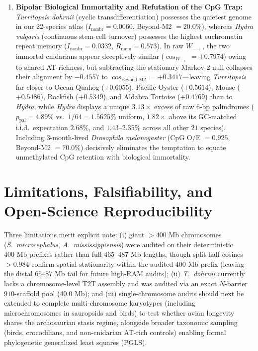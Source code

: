 \documentclass[11pt,a4paper]{article}
\renewcommand{\_}{\origunderscore\penalty200\relax}
\theoremstyle{remark}
\begin{document}
\begin{enumerate}
  \item \textbf{Bipolar Biological Immortality and Refutation of the CpG Trap:} \textit{Turritopsis dohrnii} (cyclic transdifferentiation) possesses the quietest genome in our 22-species atlas ($I_{\mathrm{nonbr}}=0.0060$, Beyond-M2 $=20.0\%$), whereas \textit{Hydra vulgaris} (continuous stem-cell turnover) possesses the highest euchromatin repeat memory ($I_{\mathrm{nonbr}}=0.0332$, $R_{\mathrm{mem}}=0.573$). In raw $W_{-+}$, the two immortal cnidarians appear deceptively similar ($\cos_{W_{-+}} = +0.7974$) owing to shared AT-richness, but subtracting the stationary Markov-2 null collapses their alignment by $-0.4557$ to $\cos_{\mathrm{Beyond\text{-}M2}} = +0.3417$---leaving \textit{Turritopsis} far closer to Ocean Quahog ($+0.6055$), Pacific Oyster ($+0.5614$), Mouse ($+0.5486$), Rockfish ($+0.5349$), and Aldabra Tortoise ($+0.4769$) than to \textit{Hydra}, while \textit{Hydra} displays a unique $3.13\times$ excess of raw 6-bp palindromes ($p_{\mathrm{pal}} = 4.89\%$ vs.\ $1/64 = 1.5625\%$ uniform, $1.82\times$ above its GC-matched i.i.d.\ expectation $2.68\%$, and $1.43\text{--}2.35\%$ across all other $21$ species). Including $3$-month-lived \textit{Drosophila melanogaster} ($\mathrm{CpG}$ O/E $=0.925$, Beyond-M2 $=70.0\%$) decisively eliminates the temptation to equate unmethylated $\mathrm{CpG}$ retention with biological immortality.
\end{enumerate}

\section{Limitations, Falsifiability, and Open-Science Reproducibility}
Three limitations merit explicit note: (i) giant $>400\text{ Mb}$ chromosomes (\textit{S.\ microcephalus}, \textit{A.\ mississippiensis}) were audited on their deterministic $400\text{ Mb}$ prefixes rather than full $465\text{--}487\text{ Mb}$ lengths, though split-half cosines $>0.984$ confirm spatial stationarity within the audited $400\text{-Mb}$ prefix (leaving the distal $65\text{--}87\text{ Mb}$ tail for future high-RAM audits); (ii) \textit{T.\ dohrnii} currently lacks a chromosome-level T2T assembly and was audited via an exact $N$-barrier $910$-scaffold pool ($40.0\text{ Mb}$); and (iii) single-chromosome audits should next be extended to complete multi-chromosome karyotypes (including microchromosomes in sauropsids and birds) to test whether avian longevity shares the archosaurian stasis regime, alongside broader taxonomic sampling (birds, crocodilians, and non-cnidarian AT-rich controls) enabling formal phylogenetic generalized least squares (PGLS).
\end{document}
